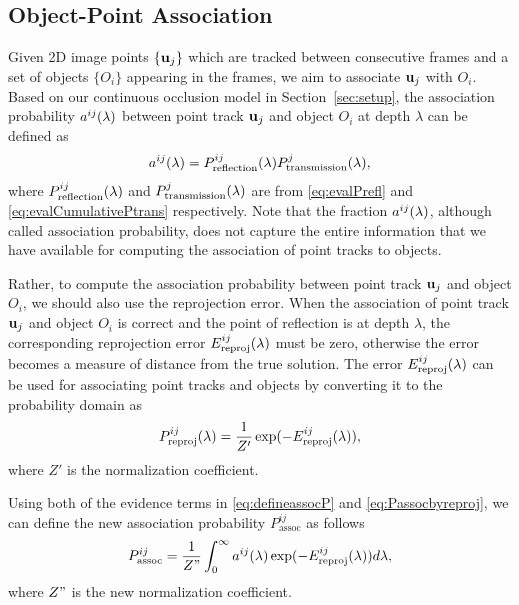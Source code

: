 \subsection{Object-Point Association}
\label{sec:association}


Given 2D image points $\{\mathbf{u}_j\}$ which are tracked between consecutive frames and a set of objects $\{O_i\}$ appearing in the frames, we aim to associate $\mathbf{u}_j$ with $O_i$. Based on our continuous occlusion model in Section~\ref{sec:setup}, the association probability $a^{ij}(\lambda)$ between point track $\mathbf{u}_j$ and object $O_i$ at depth $\lambda$ can be defined as
\begin{align}
a^{ij}(\lambda) = P^{ij}_{\text{reflection}}(\lambda)P^{j}_{\text{transmission}}(\lambda),
\label{eq:defineassocP}
\end{align}
where $P^{ij}_{\text{reflection}}(\lambda)$ and $P^{j}_{\text{transmission}}(\lambda)$ are from \eqref{eq:evalPrefl} and \eqref{eq:evalCumulativePtrans} respectively. Note that the fraction $a^{ij}(\lambda)$, although called association probability, does not capture the entire information that we have available for computing the association of point tracks to objects. 

Rather, to compute the association probability between point track $\mathbf{u}_j$ and object $O_i$, we should also use the reprojection error. When the association of point track $\mathbf{u}_j$ and object $O_i$ is correct and the point of reflection is at depth $\lambda$, the corresponding reprojection error $E^{ij}_{\text{reproj}}(\lambda)$ must be zero, otherwise the error becomes a measure of distance from the true solution. The error $E^{ij}_{\text{reproj}}(\lambda)$ can be used for associating point tracks and objects by converting it to the probability domain as
\begin{align}
  P^{ij}_{\text{reproj}}(\lambda) = \frac{1}{Z'}\exp(-E^{ij}_{\text{reproj}}(\lambda)),
\label{eq:Passocbyreproj}
\end{align}
where $Z'$ is the normalization coefficient.

Using both of the evidence terms in \eqref{eq:defineassocP} and \eqref{eq:Passocbyreproj}, we can define the new association probability $P^{ij}_{\text{assoc}}$ as follows
\begin{align}
  P^{ij}_{\text{assoc}} = \frac{1}{Z"}\int_0^{\infty} a^{ij}(\lambda) \exp(-E^{ij}_{\text{reproj}}(\lambda))d\lambda,
  \label{eq:prob-assoc}
\end{align}
where $Z"$ is the new normalization coefficient.

